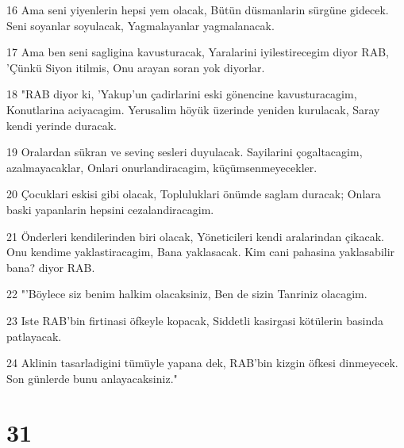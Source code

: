 \par 16 Ama seni yiyenlerin hepsi yem olacak, Bütün düsmanlarin sürgüne gidecek. Seni soyanlar soyulacak, Yagmalayanlar yagmalanacak.
\par 17 Ama ben seni sagligina kavusturacak, Yaralarini iyilestirecegim diyor RAB, 'Çünkü Siyon itilmis, Onu arayan soran yok diyorlar.
\par 18 "RAB diyor ki, 'Yakup'un çadirlarini eski gönencine kavusturacagim, Konutlarina aciyacagim. Yerusalim höyük üzerinde yeniden kurulacak, Saray kendi yerinde duracak.
\par 19 Oralardan sükran ve sevinç sesleri duyulacak. Sayilarini çogaltacagim, azalmayacaklar, Onlari onurlandiracagim, küçümsenmeyecekler.
\par 20 Çocuklari eskisi gibi olacak, Topluluklari önümde saglam duracak; Onlara baski yapanlarin hepsini cezalandiracagim.
\par 21 Önderleri kendilerinden biri olacak, Yöneticileri kendi aralarindan çikacak. Onu kendime yaklastiracagim, Bana yaklasacak. Kim cani pahasina yaklasabilir bana? diyor RAB.
\par 22 "'Böylece siz benim halkim olacaksiniz, Ben de sizin Tanriniz olacagim.
\par 23 Iste RAB'bin firtinasi öfkeyle kopacak, Siddetli kasirgasi kötülerin basinda patlayacak.
\par 24 Aklinin tasarladigini tümüyle yapana dek, RAB'bin kizgin öfkesi dinmeyecek. Son günlerde bunu anlayacaksiniz."

\chapter{31}

